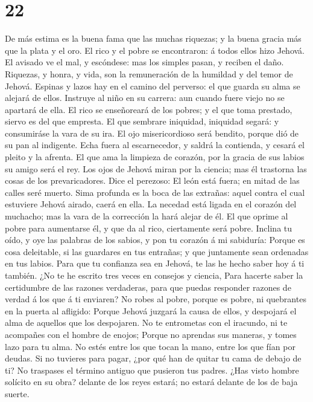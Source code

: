 \hypertarget{section-21}{%
\section{22}\label{section-21}}

 De más estima es la buena fama que las muchas riquezas; y
la buena gracia más que la plata y el oro.  El rico y el
pobre se encontraron: á todos ellos hizo Jehová.  El avisado
ve el mal, y escóndese: mas los simples pasan, y reciben el daño.
 Riquezas, y honra, y vida, son la remuneración de la
humildad y del temor de Jehová.  Espinas y lazos hay en el
camino del perverso: el que guarda su alma se alejará de ellos.
 Instruye al niño en su carrera: aun cuando fuere viejo no
se apartará de ella.  El rico se enseñoreará de los pobres;
y el que toma prestado, siervo es del que empresta.  El que
sembrare iniquidad, iniquidad segará: y consumiráse la vara de su ira.
 El ojo misericordioso será bendito, porque dió de su pan al
indigente.  Echa fuera al escarnecedor, y saldrá la
contienda, y cesará el pleito y la afrenta.  El que ama la
limpieza de corazón, por la gracia de sus labios su amigo será el rey.
 Los ojos de Jehová miran por la ciencia; mas él trastorna
las cosas de los prevaricadores.  Dice el perezoso: El león
está fuera; en mitad de las calles seré muerto.  Sima
profunda es la boca de las extrañas: aquel contra el cual estuviere
Jehová airado, caerá en ella.  La necedad está ligada en el
corazón del muchacho; mas la vara de la corrección la hará alejar de él.
 El que oprime al pobre para aumentarse él, y que da al
rico, ciertamente será pobre.  Inclina tu oído, y oye las
palabras de los sabios, y pon tu corazón á mi sabiduría: 
Porque es cosa deleitable, si las guardares en tus entrañas; y que
juntamente sean ordenadas en tus labios.  Para que tu
confianza sea en Jehová, te las he hecho saber hoy á ti también.
 ¿No te he escrito tres veces en consejos y ciencia,
 Para hacerte saber la certidumbre de las razones
verdaderas, para que puedas responder razones de verdad á los que á ti
enviaren?  No robes al pobre, porque es pobre, ni
quebrantes en la puerta al afligido:  Porque Jehová juzgará
la causa de ellos, y despojará el alma de aquellos que los despojaren.
 No te entrometas con el iracundo, ni te acompañes con el
hombre de enojos;  Porque no aprendas sus maneras, y tomes
lazo para tu alma.  No estés entre los que tocan la mano,
entre los que fían por deudas.  Si no tuvieres para pagar,
¿por qué han de quitar tu cama de debajo de ti?  No
traspases el término antiguo que pusieron tus padres.  ¿Has
visto hombre solícito en su obra? delante de los reyes estará; no estará
delante de los de baja suerte.

